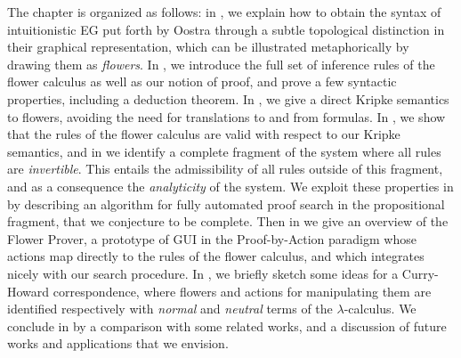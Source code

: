 The chapter is organized as follows: in , we explain how to
obtain the syntax of intuitionistic EG put forth by Oostra through a subtle
topological distinction in their graphical representation, which can be
illustrated metaphorically by drawing them as \emph{flowers}. In
, we introduce the full set of inference rules of the flower
calculus as well as our notion of proof, and prove a few syntactic properties,
including a deduction theorem. In , we give a direct Kripke
semantics to flowers, avoiding the need for translations to and from formulas.
In , we show that the rules of the flower calculus are valid
with respect to our Kripke semantics, and in  we identify a
complete fragment of the system where all rules are \emph{invertible}. This
entails the admissibility of all rules outside of this fragment, and as a
consequence the \emph{analyticity} of the system. We exploit these properties in
 by describing an algorithm for fully automated proof
search in the propositional fragment, that we conjecture to be complete. Then in
 we give an overview of the Flower Prover, a prototype of
GUI in the Proof-by-Action paradigm whose actions map directly to the rules of
the flower calculus, and which integrates nicely with our search procedure. In
, we briefly sketch some ideas for a Curry-Howard
correspondence, where flowers and actions for manipulating them are identified
respectively with \emph{normal} and \emph{neutral} terms of the
$\lambda$-calculus. We conclude in  by a comparison with some
related works, and a discussion of future works and applications that we
envision.




